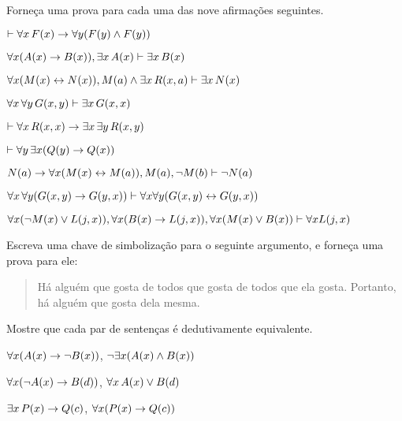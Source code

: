 \problempart
\label{pr.someFOLproofs}
Forne\c ca uma prova para cada uma das nove afirma\c c\~oes seguintes. 
\begin{earg}
\item $\vdash \forall x\,\mathord{F}(x) \rightarrow \forall y(\mathord{F}(y) \wedge \mathord{F}(y))$
\item $\forall x(\mathord{A}(x)\rightarrow \mathord{B}(x)), \exists x\,\mathord{A}(x) \vdash \exists x\,\mathord{B}(x)$
\item $\forall x(\mathord{M}(x) \leftrightarrow \mathord{N}(x)), \mathord{M}(a) \wedge \exists x\,\mathord{R}(x,a) \vdash \exists x\,\mathord{N}(x)$
\item $\forall x\, \forall y\,\mathord{G}(x,y)\vdash\exists x\,\mathord{G}(x,x)$
\item $\vdash\forall x\,\mathord{R}(x,x) \rightarrow \exists x\, \exists y\,\mathord{R}(x,y)$
\item $\vdash\forall y\, \exists x (\mathord{Q}(y) \rightarrow \mathord{Q}(x))$
\item $\mathord{N}(a) \rightarrow \forall x(\mathord{M}(x) \leftrightarrow \mathord{M}(a)), \mathord{M}(a), \neg\mathord{M}(b)\vdash \neg \mathord{N}(a)$
\item $\forall x\, \forall y (\mathord{G}(x,y) \rightarrow \mathord{G}(y,x)) \vdash \forall x\forall y (\mathord{G}(x,y) \leftrightarrow \mathord{G}(y,x))$
\item $\forall x(\neg\mathord{M}(x) \vee \mathord{L}(j,x)), \forall x(\mathord{B}(x)\rightarrow \mathord{L}(j,x)), \forall x(\mathord{M}(x)\vee \mathord{B}(x))\vdash \forall x\mathord{L}(j,x)$
\end{earg}
 
\solutions
\problempart
\label{pr.likes}
Escreva uma chave de simboliza\c c\~ao para o seguinte argumento, e forne\c ca uma prova para ele:
\begin{quote}
H\'a algu\'em que gosta de todos que gosta de todos que ela gosta. Portanto, h\'a algu\'em que gosta dela mesma.
\end{quote}


\problempart
Mostre que cada par de senten\c cas \'e dedutivamente equivalente.
\begin{earg}
\item $\forall x (\mathord{A}(x)\rightarrow \neg \mathord{B}(x))$, $\neg\exists x(\mathord{A}(x) \wedge \mathord{B}(x))$
\item $\forall x (\neg\mathord{A}(x)\rightarrow \mathord{B}(d))$, $\forall x\,\mathord{A}(x) \vee \mathord{B}(d)$
\item $\exists x\,\mathord{P}(x) \rightarrow \mathord{Q}(c)$, $\forall x (\mathord{P}(x) \rightarrow \mathord{Q}(c))$
\end{earg}

